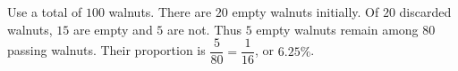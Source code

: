 Use a total of $100$ walnuts. There are $20$ empty walnuts initially. Of $20$ discarded walnuts, $15$ are empty and $5$ are not. Thus $5$ empty walnuts remain among $80$ passing walnuts. Their proportion is $\dfrac{5}{80}=\dfrac{1}{16}$, or $\boxed{6.25\%}$.
